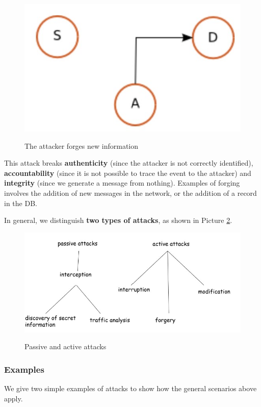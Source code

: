 \begin{figure}[h!]
    \centering
    \includegraphics[scale = 0.7]{img/sec4.jpg}
    \label{sec4}
    \caption{The attacker forges new information}
\end{figure}

This attack breaks \textbf{authenticity} (since the attacker is not correctly identified), \textbf{accountability} (since it is not possible to trace the event to the attacker) and \textbf{integrity} (since we generate a message from nothing). Examples of forging involves the addition of new messages in the network, or the addition of a record in the DB.

In general, we distinguish \textbf{two types of attacks}, as shown in Picture \ref{sec8}.

\begin{figure}[h!]
    \centering
    \includegraphics[scale = 1.2]{img/sec8.jpg}
    \label{sec8}
    \caption{Passive and active attacks}
\end{figure}

\subsubsection{Examples}
We give two simple examples of attacks to show how the general scenarios above apply.

